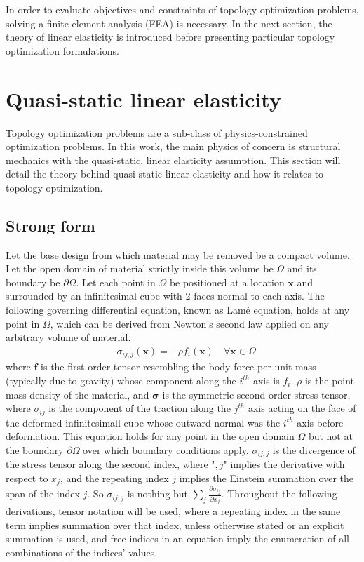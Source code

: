 In order to evaluate objectives and constraints of topology optimization problems, solving a finite element analysis (FEA) is necessary. In the next section, the theory of linear elasticity is introduced before presenting particular topology optimization formulations.

\newpage
\section{Quasi-static linear elasticity}

    Topology optimization problems are a sub-class of physics-constrained optimization problems. In this work, the main physics of concern is structural mechanics with the quasi-static, linear elasticity assumption. This section will detail the theory behind quasi-static linear elasticity and how it relates to topology optimization.

\subsection{Strong form}

	Let the base design from which material may be removed be a compact volume. Let the open domain of material strictly inside this volume be $\Omega$ and its boundary be $\partial \Omega$. Let each point in $\Omega$ be positioned at a location $\bm{x}$ and surrounded by an infinitesimal cube with 2 faces normal to each axis. The following governing differential equation, known as Lam\'e equation, holds at any point in $\Omega$, which can be derived from Newton's second law applied on any arbitrary volume of material.
	\begin{align} \label{governing}
		& \sigma_{ij,j}(\bm{x}) = -\rho f_i(\bm{x}) \quad \forall \bm{x} \in \Omega
	\end{align}
	where $\bm{f}$ is the first order tensor resembling the body force per unit mass (typically due to gravity) whose component along the $i^{th}$ axis is $f_i$. $\rho$ is the point mass density of the material, and $\bm{\sigma}$ is the symmetric second order stress tensor, where $\sigma_{ij}$ is the component of the traction along the $j^{th}$ axis acting on the face of the deformed infinitesimall cube whose outward normal was the $i^{th}$ axis before deformation. This equation holds for any point in the open domain $\Omega$ but not at the boundary $\partial\Omega$ over which boundary conditions apply. $\sigma_{ij,j}$ is the divergence of the stress tensor along the second index, where "$,j$" implies the derivative with respect to $x_j$, and the repeating index $j$ implies the Einstein summation over the span of the index $j$. So $\sigma_{ij,j}$ is nothing but $\sum_{j} \frac{\partial \sigma_{ij}}{\partial x_j}$. Throughout the following derivations, tensor notation will be used, where a repeating index in the same term implies summation over that index, unless otherwise stated or an explicit summation is used, and free indices in an equation imply the enumeration of all combinations of the indices' values.

